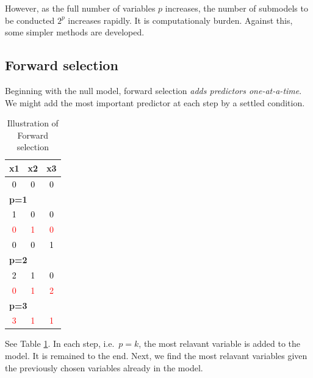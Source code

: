 \documentclass[]{book}
\theoremstyle{definition}
\theoremstyle{definition}
\theoremstyle{definition}
\theoremstyle{remark}
\begin{document}
However, as the full number of variables \(p\) increases, the number of submodels to be conducted \(2^p\) increases rapidly. It is computationaly burden. Against this, some simpler methods are developed.

\hypertarget{forward-selection}{%
\subsection{Forward selection}\label{forward-selection}}

Beginning with the null model, forward selection \emph{adds predictors one-at-a-time}. We might add the most important predictor at each step by a settled condition.

\begin{longtable}{c|c|c}
\caption{\label{tab:fstab}Illustration of Forward selection}\\
\hline
x1 & x2 & x3\\
\hline
\textcolor{black}{0} & \textcolor{black}{0} & \textcolor{black}{0}\\
\hline
\multicolumn{3}{l}{\textbf{p=1}}\\
\hline
\hspace{1em}\textcolor{black}{1} & \textcolor{black}{0} & \textcolor{black}{0}\\
\hline
\hspace{1em}\textcolor{red}{0} & \textcolor{red}{1} & \textcolor{red}{0}\\
\hline
\hspace{1em}\textcolor{black}{0} & \textcolor{black}{0} & \textcolor{black}{1}\\
\hline
\multicolumn{3}{l}{\textbf{p=2}}\\
\hline
\hspace{1em}\textcolor{black}{2} & \textcolor{black}{1} & \textcolor{black}{0}\\
\hline
\hspace{1em}\textcolor{red}{0} & \textcolor{red}{1} & \textcolor{red}{2}\\
\hline
\multicolumn{3}{l}{\textbf{p=3}}\\
\hline
\hspace{1em}\textcolor{red}{3} & \textcolor{red}{1} & \textcolor{red}{1}\\
\hline
\end{longtable}

See Table \ref{tab:fstab}. In each step, i.e.~\(p = k\), the most relavant variable is added to the model. It is remained to the end. Next, we find the most relavant variables given the previously chosen variables already in the model.
\end{document}
